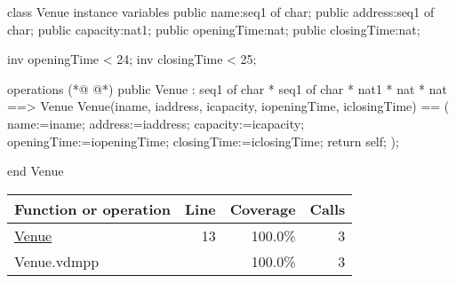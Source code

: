 \begin{vdmpp}[breaklines=true]
class Venue
instance variables
 public name:seq1 of char;
  public address:seq1 of char;
  public capacity:nat1;
  public openingTime:nat;
  public closingTime:nat;
  
  inv openingTime < 24;
  inv closingTime < 25;

operations
(*@
\label{Venue:13}
@*)
  public  Venue : seq1 of char * seq1 of char * nat1 * nat * nat  ==> Venue
  Venue(iname, iaddress, icapacity, iopeningTime, iclosingTime) == (
   name:=iname;
   address:=iaddress;
   capacity:=icapacity;
   openingTime:=iopeningTime;
   closingTime:=iclosingTime;
   return self;
  );

end Venue
\end{vdmpp}
\bigskip
\begin{longtable}{|l|r|r|r|}
\hline
Function or operation & Line & Coverage & Calls \\
\hline
\hline
\hyperref[Venue:13]{Venue} & 13&100.0\% & 3 \\
\hline
\hline
Venue.vdmpp & & 100.0\% & 3 \\
\hline
\end{longtable}

